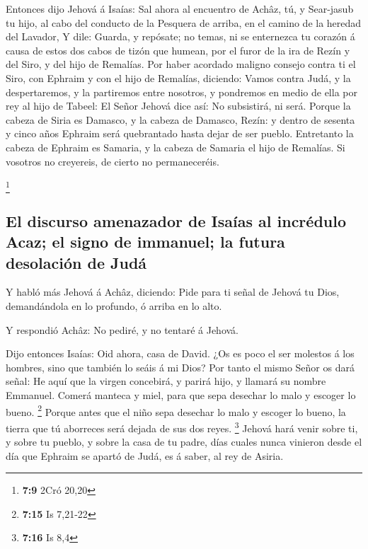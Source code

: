  Entonces dijo Jehová á Isaías: Sal ahora al encuentro de
Achâz, tú, y Sear-jasub tu hijo, al cabo del conducto de la Pesquera de
arriba, en el camino de la heredad del Lavador,  Y dile:
Guarda, y repósate; no temas, ni se enternezca tu corazón á causa de
estos dos cabos de tizón que humean, por el furor de la ira de Rezín y
del Siro, y del hijo de Remalías.  Por haber acordado
maligno consejo contra ti el Siro, con Ephraim y con el hijo de
Remalías, diciendo:  Vamos contra Judá, y la
despertaremos, y la partiremos entre nosotros, y pondremos en medio de
ella por rey al hijo de Tabeel:  El Señor Jehová dice así:
No subsistirá, ni será.  Porque la cabeza de Siria es
Damasco, y la cabeza de Damasco, Rezín: y dentro de sesenta y cinco años
Ephraim será quebrantado hasta dejar de ser pueblo. 
Entretanto la cabeza de Ephraim es Samaria, y la cabeza de Samaria el
hijo de Remalías. Si vosotros no creyereis, de cierto no permaneceréis.

\footnote{\textbf{7:9} 2Cró 20,20}

\hypertarget{el-discurso-amenazador-de-isauxedas-al-incruxe9dulo-acaz-el-signo-de-immanuel-la-futura-desolaciuxf3n-de-juduxe1}{%
\subsection{El discurso amenazador de Isaías al incrédulo Acaz; el signo
de immanuel; la futura desolación de
Judá}\label{el-discurso-amenazador-de-isauxedas-al-incruxe9dulo-acaz-el-signo-de-immanuel-la-futura-desolaciuxf3n-de-juduxe1}}

 Y habló más Jehová á Achâz, diciendo: 
Pide para ti señal de Jehová tu Dios, demandándola en lo profundo, ó
arriba en lo alto.

 Y respondió Achâz: No pediré, y no tentaré á Jehová.

 Dijo entonces Isaías: Oid ahora, casa de David. ¿Os es
poco el ser molestos á los hombres, sino que también lo seáis á mi Dios?
 Por tanto el mismo Señor os dará señal: He aquí que la
virgen concebirá, y parirá hijo, y llamará su nombre Emmanuel.
 Comerá manteca y miel, para que sepa desechar lo malo y
escoger lo bueno. \footnote{\textbf{7:15} Is 7,21-22} 
Porque antes que el niño sepa desechar lo malo y escoger lo bueno, la
tierra que tú aborreces será dejada de sus dos reyes. \footnote{\textbf{7:16}
  Is 8,4}  Jehová hará venir sobre ti, y sobre tu pueblo,
y sobre la casa de tu padre, días cuales nunca vinieron desde el día que
Ephraim se apartó de Judá, es á saber, al rey de Asiria.

